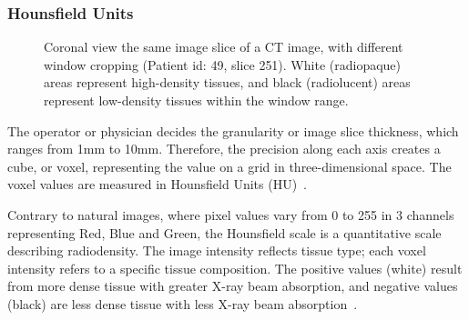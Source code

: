 \documentclass[12pt,twoside]{report}
\begin{document}
\subsubsection{Hounsfield Units}

\begin{figure}[H]
    \centering
    \caption{Coronal view the same image slice of a CT image, with different window cropping (Patient id: 49, slice 251). White (radiopaque) areas represent high-density tissues, and black (radiolucent) areas represent low-density tissues within the window range.}\label{fig:ct-windows}
\end{figure}

The operator or physician decides the granularity or image slice thickness, which ranges from 1mm to 10mm. Therefore, the precision along each axis creates a cube, or voxel, representing the value on a grid in three-dimensional space. The voxel values are measured in Hounsfield Units (HU)~\cite{diagnostic-radiology-physics}. 

Contrary to natural images, where pixel values vary from 0 to 255 in 3 channels representing Red, Blue and Green, the Hounsfield scale is a quantitative scale describing radiodensity. The image intensity reflects tissue type; each voxel intensity refers to a specific tissue composition. The positive values (white) result from more dense tissue with greater X-ray beam absorption, and negative values (black) are less dense tissue with less X-ray beam absorption~\cite{Statpearls}.  
\end{document}
